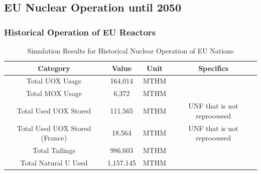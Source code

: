 \subsection{EU Nuclear Operation until 2050}

\begin{frame}
	\frametitle{Historical Operation of EU Reactors}

\begin{table}[h]
	\centering
		\begin{tabular}{cccc}
			\hline
			\textbf{Category } & \textbf{Value} & \textbf{Unit} & \textbf{Specifics}\\ \hline
			Total UOX Usage  & 164,014 & MTHM &  \\ 
			Total MOX Usage  & 6,372 & MTHM & \\ 
			Total Used UOX Stored  & 111,565 & MTHM & \gls{UNF} that is not reprocessed\\  
			Total Used UOX Stored (France) & 18,564 & MTHM & \gls{UNF} that is not reprocessed \\
			Total Tailings  & 986,603 & MTHM & \\ 
			Total Natural U Used  & 1,157,145 & MTHM & \\ \hline
		\end{tabular}
		\caption{Simulation Results for Historical Nuclear Operation 
		of \gls{EU} Nations}
		\label{tab:sim_result}
\end {table}

\end{frame}

